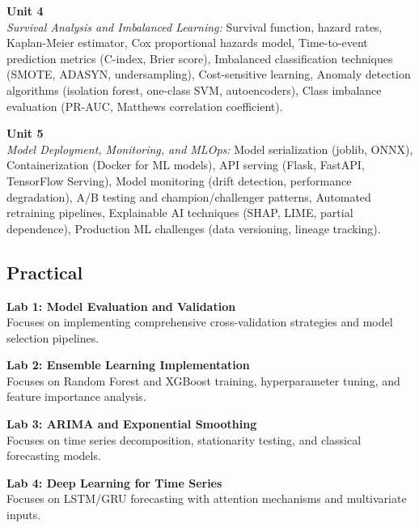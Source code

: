 \noindent\textbf{Unit 4} \\
\textit{Survival Analysis and Imbalanced Learning:} Survival function, hazard rates, Kaplan-Meier estimator, Cox proportional hazards model, Time-to-event prediction metrics (C-index, Brier score), Imbalanced classification techniques (SMOTE, ADASYN, undersampling), Cost-sensitive learning, Anomaly detection algorithms (isolation forest, one-class SVM, autoencoders), Class imbalance evaluation (PR-AUC, Matthews correlation coefficient).

\vspace{0.3cm}

\noindent\textbf{Unit 5} \\
\textit{Model Deployment, Monitoring, and MLOps:} Model serialization (joblib, ONNX), Containerization (Docker for ML models), API serving (Flask, FastAPI, TensorFlow Serving), Model monitoring (drift detection, performance degradation), A/B testing and champion/challenger patterns, Automated retraining pipelines, Explainable AI techniques (SHAP, LIME, partial dependence), Production ML challenges (data versioning, lineage tracking).

\newpage

\subsection*{Practical}
\noindent\textbf{Lab 1: Model Evaluation and Validation} \\
Focuses on implementing comprehensive cross-validation strategies and model selection pipelines.

\vspace{0.2cm}

\noindent\textbf{Lab 2: Ensemble Learning Implementation} \\
Focuses on Random Forest and XGBoost training, hyperparameter tuning, and feature importance analysis.

\vspace{0.2cm}

\noindent\textbf{Lab 3: ARIMA and Exponential Smoothing} \\
Focuses on time series decomposition, stationarity testing, and classical forecasting models.

\vspace{0.2cm}

\noindent\textbf{Lab 4: Deep Learning for Time Series} \\
Focuses on LSTM/GRU forecasting with attention mechanisms and multivariate inputs.

